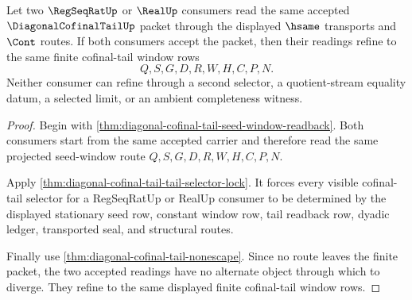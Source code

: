 \begin{theorem}
\label{thm:diagonal-cofinal-tail-common-window-refinement}
Let two $\RegSeqRatUp$ or $\RealUp$ consumers read the same accepted $\DiagonalCofinalTailUp$ packet through the displayed $\hsame$ transports and $\Cont$ routes. If both consumers accept the packet, then their readings refine to the same finite cofinal-tail window rows
$$
Q,S,G,D,R,W,H,C,P,N.
$$
Neither consumer can refine through a second selector, a quotient-stream equality datum, a selected limit, or an ambient completeness witness.
\end{theorem}
\begin{proof}
Begin with \autoref{thm:diagonal-cofinal-tail-seed-window-readback}. Both consumers start from the same accepted carrier and therefore read the same projected seed-window route $Q,S,G,D,R,W,H,C,P,N$.

Apply \autoref{thm:diagonal-cofinal-tail-tail-selector-lock}. It forces every visible cofinal-tail selector for a RegSeqRatUp or RealUp consumer to be determined by the displayed stationary seed row, constant window row, tail readback row, dyadic ledger, transported seal, and structural routes.

Finally use \autoref{thm:diagonal-cofinal-tail-nonescape}. Since no route leaves the finite packet, the two accepted readings have no alternate object through which to diverge. They refine to the same displayed finite cofinal-tail window rows.
\end{proof}


